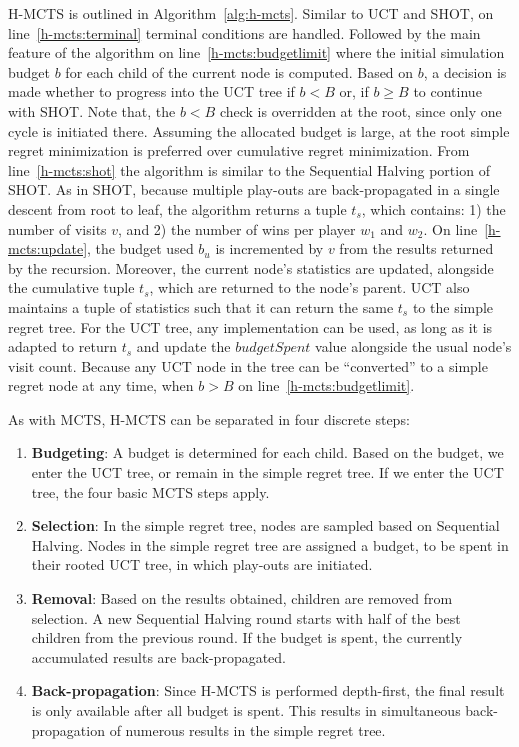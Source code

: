 \documentclass{kecsmstr}
\begin{document}
H-MCTS is outlined in Algorithm~\ref{alg:h-mcts}. Similar to UCT and SHOT, on line~\ref{h-mcts:terminal} terminal conditions are handled. Followed by the main feature of the algorithm on line~\ref{h-mcts:budgetlimit} where the initial simulation budget $b$ for each child of the current node is computed. Based on $b$, a decision is made whether to progress into the UCT tree if $b<B$ or, if $b \geq B$ to continue with SHOT. Note that, the $b<B$ check is overridden at the root, since only one cycle is initiated there. Assuming the allocated budget is large, at the root simple regret minimization is preferred over cumulative regret minimization. From line~\ref{h-mcts:shot} the algorithm is similar to the Sequential Halving portion of SHOT. As in SHOT, because multiple play-outs are back-propagated in a single descent from root to leaf, the algorithm returns a tuple $t_s$, which contains: 1) the number of visits $v$, and 2) the number of wins per player $w_1$ and $w_2$. On line~\ref{h-mcts:update}, the budget used $b_u$ is incremented by $v$ from the results returned by the recursion. Moreover, the current node's statistics are updated, alongside the cumulative tuple $t_s$, which are returned to the node's parent. UCT also maintains a tuple of statistics such that it can return the same $t_s$ to the simple regret tree. For the UCT tree, any implementation can be used, as long as it is adapted to return $t_s$ and update the $budgetSpent$ value alongside the usual node's visit count. Because any UCT node in the tree can be ``converted'' to a simple regret node at any time, when $b>B$ on line~\ref{h-mcts:budgetlimit}. 

As with MCTS, H-MCTS can be separated in four discrete steps:
\begin{enumerate}
\item \textbf{Budgeting}: A budget is determined for each child. Based on the budget, we enter the UCT tree, or remain in the simple regret tree. If we enter the UCT tree, the four basic MCTS steps apply.
\item \textbf{Selection}: In the simple regret tree, nodes are sampled based on Sequential Halving. Nodes in the simple regret tree are assigned a budget, to be spent in their rooted UCT tree, in which play-outs are initiated.
\item \textbf{Removal}: Based on the results obtained, children are removed from selection. A new Sequential Halving round starts with half of the best children from the previous round. If the budget is spent, the currently accumulated results are back-propagated.
\item \textbf{Back-propagation}: Since H-MCTS is performed depth-first, the final result is only available after all budget is spent. This results in simultaneous back-propagation of numerous results in the simple regret tree.
\end{enumerate}
\end{document}
